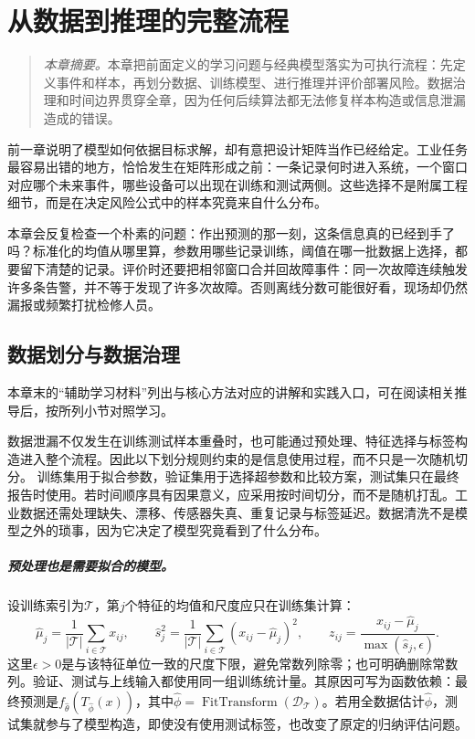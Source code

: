 ﻿\chapter{从数据到推理的完整流程}
\label{chap:pipeline}
\begin{quote}\small
\textit{本章摘要。}本章把前面定义的学习问题与经典模型落实为可执行流程：先定义事件和样本，再划分数据、训练模型、进行推理并评价部署风险。数据治理和时间边界贯穿全章，因为任何后续算法都无法修复样本构造或信息泄漏造成的错误。
\end{quote}
前一章说明了模型如何依据目标求解，却有意把设计矩阵当作已经给定。工业任务最容易出错的地方，恰恰发生在矩阵形成之前：一条记录何时进入系统，一个窗口对应哪个未来事件，哪些设备可以出现在训练和测试两侧。这些选择不是附属工程细节，而是在决定风险公式中的样本究竟来自什么分布。

本章会反复检查一个朴素的问题：作出预测的那一刻，这条信息真的已经到手了吗？标准化的均值从哪里算，参数用哪些记录训练，阈值在哪一批数据上选择，都要留下清楚的记录。评价时还要把相邻窗口合并回故障事件：同一次故障连续触发许多条告警，并不等于发现了许多次故障。否则离线分数可能很好看，现场却仍然漏报或频繁打扰检修人员。

\section{数据划分与数据治理}

本章末的“辅助学习材料”列出与核心方法对应的讲解和实践入口，可在阅读相关推导后，按所列小节对照学习。

数据泄漏不仅发生在训练测试样本重叠时，也可能通过预处理、特征选择与标签构造进入整个流程\cite{kaufman2012leakage}。因此以下划分规则约束的是信息使用过程，而不只是一次随机切分。
训练集用于拟合参数，验证集用于选择超参数和比较方案，测试集只在最终报告时使用。若时间顺序具有因果意义，应采用按时间切分，而不是随机打乱。工业数据还需处理缺失、漂移、传感器失真、重复记录与标签延迟。数据清洗不是模型之外的琐事，因为它决定了模型究竟看到了什么分布。

\paragraph{预处理也是需要拟合的模型。}
设训练索引为$\mathcal T$，第$j$个特征的均值和尺度应只在训练集计算：
\begin{equation}
 \hat\mu_j=\frac1{|\mathcal T|}\sum_{i\in\mathcal T}x_{ij},\qquad
 \hat s_j^2=\frac1{|\mathcal T|}\sum_{i\in\mathcal T}(x_{ij}-\hat\mu_j)^2,
 \qquad z_{ij}=\frac{x_{ij}-\hat\mu_j}{\max(\hat s_j,\epsilon)}.
\end{equation}
这里$\epsilon>0$是与该特征单位一致的尺度下限，避免常数列除零；也可明确删除常数列。验证、测试与上线输入都使用同一组训练统计量。其原因可写为函数依赖：最终预测是$f_{\hat\theta}(T_{\hat\phi}(x))$，其中$\hat\phi=\operatorname{FitTransform}(\mathcal D_{\mathcal T})$。若用全数据估计$\hat\phi$，测试集就参与了模型构造，即使没有使用测试标签，也改变了原定的归纳评估问题。

